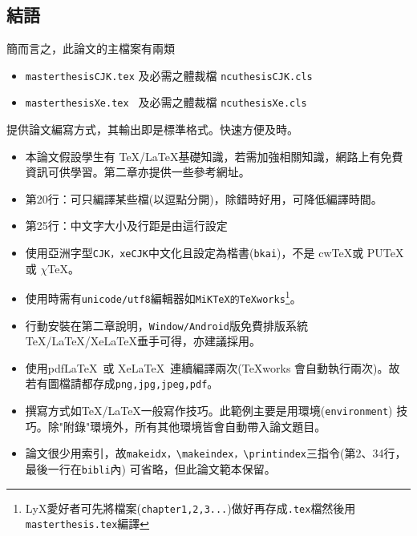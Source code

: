 \subsection{結語}
簡而言之，此論文的主檔案有兩類
\begin{itemize}
\item {\tt masterthesisCJK.tex} 及必需之體裁檔 {\tt ncuthesisCJK.cls}
\item {\tt masterthesisXe.tex } 及必需之體裁檔 {\tt ncuthesisXe.cls}
\end{itemize}
提供論文編寫方式，其輸出即是標準格式。快速方便及時。
\begin{itemize} \index{\TeX!\LaTeX}
\item 本論文假設學生有 \TeX/\LaTeX 基礎知識，若需加強相關知識，網路上有免費資訊可供學習。第二章亦提供一些參考網址。 
\item 第20行：可只編譯某些檔(以逗點分開)，除錯時好用，可降低編譯時間。
\item 第25行：中文字大小及行距是由這行設定
\item 使用亞洲字型{\tt CJK，xeCJK}中文化且設定為楷書({\tt bkai})，不是 cw\TeX 或 PU\TeX 或 $\chi$\TeX。 
\item 使用時需有{\tt unicode/utf8}編輯器如{\tt MiKTeX的TeXworks}\footnote{LyX愛好者可先將檔案({\tt chapter1,2,3...})做好再存成{\tt .tex}檔然後用{\tt masterthesis.tex}編譯}。  
\item {\color{red}行動安裝}在第二章說明，{\tt Window/Android}版免費排版系統\linebreak \TeX{}/\LaTeX{}/Xe\LaTeX{}垂手可得，亦建議採用。 
\item 使用pdf\LaTeX\ 或 Xe\LaTeX\ 連續編譯兩次(TeXworks 會自動執行兩次)。故若有圖檔請都存成{\tt png,jpg,jpeg,pdf}。
\item 撰寫方式如\TeX/\LaTeX{}一般寫作技巧。此範例主要是用環境\linebreak({\tt environment}) 技巧。除"附錄"環境外，所有其他環境皆會自動帶入論文題目。
\item {\color{red}論文很少用索引，故{\tt makeidx，\textbackslash makeindex，\textbackslash printindex}三指令(第2、34行，最後一行在{\tt bibli}內) 可省略，但此論文範本保留。}

\end{itemize}

